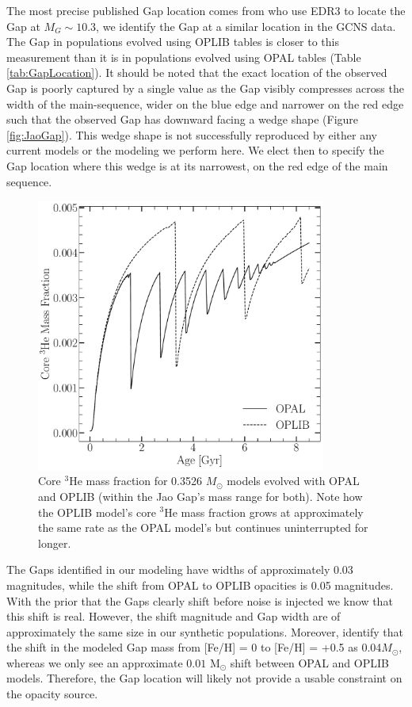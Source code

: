 The most precise published Gap location comes from \citet{Jao2020} who use EDR3
to locate the Gap at $M_{G} \sim 10.3$, we identify the Gap at a similar
location in the GCNS data. The Gap in populations evolved using OPLIB
tables is closer to this measurement than it is in populations evolved using
OPAL tables (Table \ref{tab:GapLocation}). It should be noted that the exact
location of the observed Gap is poorly captured by a single value as the Gap
visibly compresses across the width of the main-sequence, wider on the blue
edge and narrower on the red edge such that the observed Gap has downward
facing a wedge shape (Figure \ref{fig:JaoGap}). This wedge shape is not
successfully reproduced by either any current models or the modeling we perform
here. We elect then to specify the Gap location where this wedge is at its
narrowest, on the red edge of the main sequence.

\begin{figure}
	\centering
	\includegraphics[width=0.85\textwidth]{figures/jaoOpacity/Core3HECompSameMass.pdf}
	\caption{Core $^{3}$He mass fraction for  0.3526 $M_{\odot}$ models evolved
	with OPAL and OPLIB (within the Jao Gap's mass range for both). Note how
	the OPLIB model's core $^{3}$He mass fraction grows at approximately the
	same rate as the OPAL model's but continues uninterrupted for longer.}
	\label{fig:OPALOPLIB3He}
\end{figure}

The Gaps identified in our modeling have widths of approximately 0.03
magnitudes, while the shift from OPAL to OPLIB opacities is 0.05 magnitudes.
With the prior that the Gaps clearly shift before noise is injected we know
that this shift is real. However, the shift magnitude and Gap width are of
approximately the same size in our synthetic populations. Moreover,
\citet{Feiden2021} identify that the shift in the modeled Gap mass from [Fe/H]
= 0 to [Fe/H] = +0.5 as 0.04$M_{\odot}$, whereas we only see an approximate
$0.01$ M$_{\odot}$ shift between OPAL and OPLIB models. Therefore, the
Gap location will likely not provide a usable constraint on the opacity
source.
